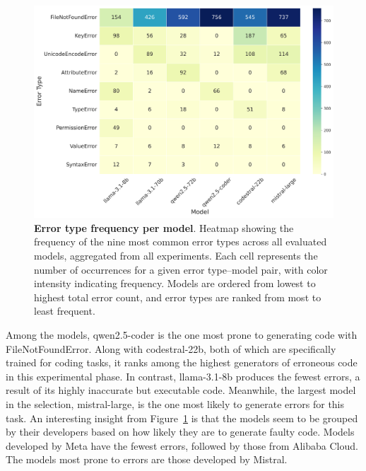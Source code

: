 \documentclass{DESSThesis}
\begin{document}
\begin{figure}[ht]
    \centering
    \includegraphics[width=0.80\linewidth]{img/Results/First Experimental Phase/Error Type Frequency per Model.png}
    \caption[Error type frequency per model]{\textbf{Error type frequency per model}. Heatmap showing the frequency of the nine most common error types across all evaluated models, aggregated from all experiments. Each cell represents the number of occurrences for a given error type–model pair, with color intensity indicating frequency. Models are ordered from lowest to highest total error count, and error types are ranked from most to least frequent.}
    \label{fig:error_frequency}
\end{figure}

Among the models, qwen2.5-coder is the one most prone to generating code with FileNotFoundError. Along with codestral-22b, both of which are specifically trained for coding tasks, it ranks among the highest generators of erroneous code in this experimental phase. In contrast, llama-3.1-8b produces the fewest errors, a result of its highly inaccurate but executable code. Meanwhile, the largest model in the selection, mistral-large, is the one most likely to generate errors for this task. An interesting insight from Figure~\ref{fig:error_frequency} is that the models seem to be grouped by their developers based on how likely they are to generate faulty code. Models developed by Meta have the fewest errors, followed by those from Alibaba Cloud. The models most prone to errors are those developed by Mistral.
\end{document}
